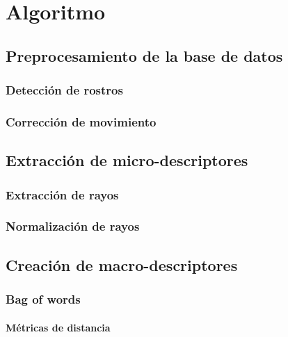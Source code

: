 \chapter[Algoritmo]{Algoritmo}
\label{ch:algoritmo}

\section{Preprocesamiento de la base de datos}
\label{sec:proc_bdd}

	\subsection{Detección de rostros}
	\label{algoritmo:det_rostro}
	
	\subsection{Corrección de movimiento}
	\label{algoritmo:cor_movimiento}

\section{Extracción de micro-descriptores}
\label{sec:micro-descriptores}

	\subsection{Extracción de rayos}
	\label{algoritmo:ext_rayos}
	
		
	\subsection{Normalización de rayos}
	\label{algoritmo:normalizacion}
	
\section{Creación de macro-descriptores}
\label{sec:macro-descriptores}

	\subsection{Bag of words}
	\label{algoritmo:bow}
		
		\subsubsection{Métricas de distancia}
		\label{algoritmo:metricas de distancia}
	
